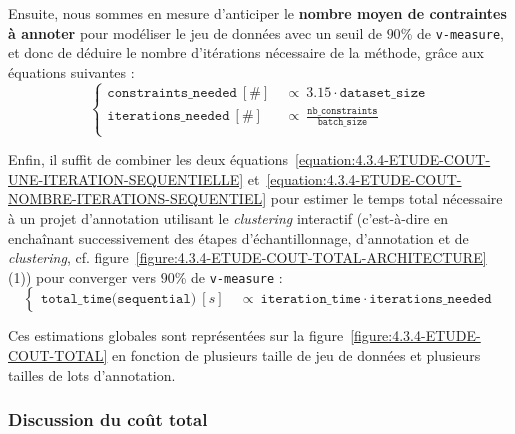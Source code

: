 			Ensuite, nous sommes en mesure d'anticiper le \textbf{nombre moyen de contraintes à annoter} pour modéliser le jeu de données avec un seuil de $90$\% de \texttt{v-measure}, et donc de déduire le nombre d'itérations nécessaire de la méthode, grâce aux équations suivantes :
			\begin{equation}
				\label{equation:4.3.4-ETUDE-COUT-NOMBRE-ITERATIONS-SEQUENTIEL}
				\begin{cases}
					\texttt{constraints\_needed}~[\#] &
						~\propto~3.15 \cdot \texttt{dataset\_size} \\
					\texttt{iterations\_needed}~[\#] &
						~\propto~\frac{\texttt{nb\_constraints}}{\texttt{batch\_size}} \\
				\end{cases}
			\end{equation}
			
			Enfin, il suffit de combiner les deux équations~\ref{equation:4.3.4-ETUDE-COUT-UNE-ITERATION-SEQUENTIELLE} et~\ref{equation:4.3.4-ETUDE-COUT-NOMBRE-ITERATIONS-SEQUENTIEL} pour estimer le temps total nécessaire à un projet d'annotation utilisant le \textit{clustering} interactif (c'est-à-dire en enchaînant successivement des étapes d'échantillonnage, d'annotation et de \textit{clustering}, cf. figure~\ref{figure:4.3.4-ETUDE-COUT-TOTAL-ARCHITECTURE} (1)) pour converger vers $90$\% de \texttt{v-measure} :
			\begin{equation}
				\label{equation:4.3.4-ETUDE-COUT-TOTAL-SEQUENTIEL}
				\begin{cases}
					\texttt{total\_time(sequential)}~[s] &
						~\propto~\texttt{iteration\_time} \cdot \texttt{iterations\_needed}
				\end{cases}
			\end{equation}
			
			Ces estimations globales sont représentées sur la figure~\ref{figure:4.3.4-ETUDE-COUT-TOTAL} en fonction de plusieurs taille de jeu de données et plusieurs tailles de lots d'annotation.

		\subsubsection{Discussion du coût total}
		
